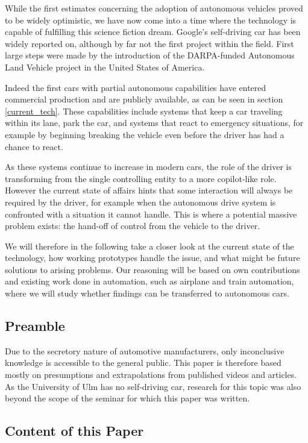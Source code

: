 \documentclass{acm_proc_article-sp}
\begin{document}
While the first estimates concerning the adoption of autonomous vehicles proved to be widely optimistic, we have now come into a time where the technology is capable of fulfilling this science fiction dream.
Google's self-driving car \cite{www:google_car} has been widely reported on, although by far not the first project within the field.
First large steps were made by the introduction of the DARPA-funded Autonomous Land Vehicle project in the United States of America.

Indeed the first cars with partial autonomous capabilities have entered commercial production and are publicly available, as can be seen in section \ref{current_tech}.
These capabilities include systems that keep a car traveling within its lane, park the car, and systems that react to emergency situations, for example by beginning breaking the vehicle even before the driver has had a chance to react.

As these systems continue to increase in modern cars, the role of the driver is transforming from the single controlling entity to a more copilot-like role.
However the current state of affairs hints that some interaction will always be required by the driver, for example when the autonomous drive system is confronted with a situation it cannot handle.
This is where a potential massive problem exists: the hand-off of control from the vehicle to the driver.

We will therefore in the following take a closer look at the current state of the technology, how working prototypes handle the issue, and what might be future solutions to arising problems.
Our reasoning will be based on own contributions and existing work done in automation, such as airplane and train automation, where we will study whether findings can be transferred to autonomous cars.

\subsection{Preamble}

Due to the secretory nature of automotive manufacturers, only inconclusive knowledge is accessible to the general public.
This paper is therefore based mostly on presumptions and extrapolations from published videos and articles.
As the University of Ulm has no self-driving car, research for this topic was also beyond the scope of the seminar for which this paper was written.

\subsection{Content of this Paper}
\end{document}
